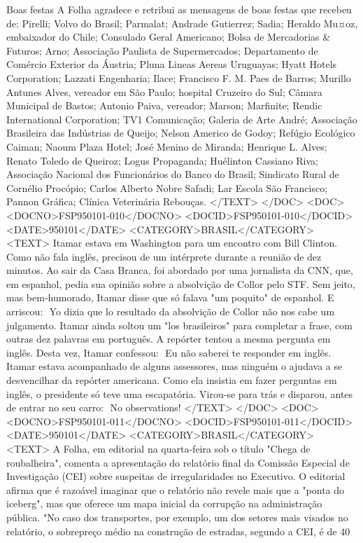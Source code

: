 Boas festas
A Folha agradece e retribui as mensagens de boas festas que recebeu de: Pirelli; Volvo do Brasil; Parmalat; Andrade Gutierrez; Sadia; Heraldo Mu¤oz, embaixador do Chile; Consulado Geral Americano; Bolsa de Mercadorias & Futuros; Arno; Associação Paulista de Supermercados; Departamento de Comércio Exterior da Áustria; Pluna Lineas Aereas Uruguayas; Hyatt Hotels Corporation; Lazzati Engenharia; Ilace; Francisco F. M. Paes de Barros; Murillo Antunes Alves, vereador em São Paulo; hospital Cruzeiro do Sul; Câmara Municipal de Bastos; Antonio Paiva, vereador; Marson; Marfinite; Rendic International Corporation; TV1 Comunicação; Galeria de Arte André; Associação Brasileira das Indústrias de Queijo; Nelson Americo de Godoy; Refúgio Ecológico Caiman; Naoum Plaza Hotel; José Menino de Miranda; Henrique L. Alves; Renato Toledo de Queiroz; Logus Propaganda; Huélinton Cassiano Riva; Associação Nacional dos Funcionários do Banco do Brasil; Sindicato Rural de Cornélio Procópio; Carlos Alberto Nobre Safadi; Lar Escola São Francisco; Pannon Gráfica; Clínica Veterinária Rebouças.
</TEXT>
</DOC>
<DOC>
<DOCNO>FSP950101-010</DOCNO>
<DOCID>FSP950101-010</DOCID>
<DATE>950101</DATE>
<CATEGORY>BRASIL</CATEGORY>
<TEXT>
Itamar estava em Washington para um encontro com Bill Clinton. Como não fala inglês, precisou de um intérprete durante a reunião de dez minutos.
Ao sair da Casa Branca, foi abordado por uma jornalista da CNN, que, em espanhol, pedia sua opinião sobre a absolvição de Collor pelo STF.
Sem jeito, mas bem-humorado, Itamar disse que só falava "um poquito" de espanhol. E arriscou:
 Yo dizia que lo resultado da absolvição de Collor não nos cabe um julgamento.
Itamar ainda soltou um "los brasileiros" para completar a frase, com outras dez palavras em português.
A repórter tentou a mesma pergunta em inglês. Desta vez, Itamar confessou:
 Eu não saberei te responder em inglês.
Itamar estava acompanhado de alguns assessores, mas ninguém o ajudava a se desvencilhar da repórter americana. Como ela insistia em fazer perguntas em inglês, o presidente só teve uma escapatória. Virou-se para trás e disparou, antes de entrar no seu carro:
 No observations!
</TEXT>
</DOC>
<DOC>
<DOCNO>FSP950101-011</DOCNO>
<DOCID>FSP950101-011</DOCID>
<DATE>950101</DATE>
<CATEGORY>BRASIL</CATEGORY>
<TEXT>
A Folha, em editorial na quarta-feira sob o título "Chega de roubalheira", comenta a apresentação do relatório final da Comissão Especial de Investigação (CEI) sobre suspeitas de irregularidades no Executivo. O editorial afirma que é razoável imaginar que o relatório não revele mais que a "ponta do iceberg", mas que oferece um mapa inicial da corrupção na administração pública. "No caso dos transportes, por exemplo, um dos setores mais visados no relatório, o sobrepreço médio na construção de estradas, segundo a CEI, é de 40%
